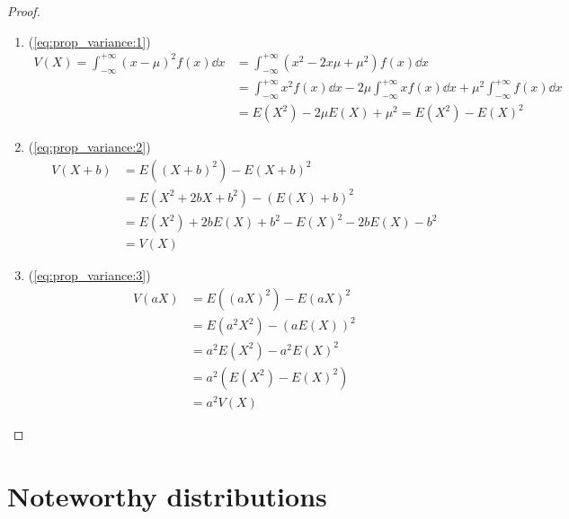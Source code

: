 \documentclass[14pt]{extarticle}
\begin{document}
\begin{proof}
    \skiplineafterproof
    \begin{enumerate}[label=\roman*.]
        \item (\autoref{eq:prop_variance:1})
              \begin{align}
                  V(X) = \int_{-\infty}^{+\infty} (x - \mu)^2 f(x) \dd{x} & = \int_{-\infty}^{+\infty} (x^2 - 2x\mu + \mu^2) f(x) \dd{x}                                                                          \\
                                                                          & = \int_{-\infty}^{+\infty} x^2 f(x) \dd{x} - 2\mu \int_{-\infty}^{+\infty} x f(x) \dd{x} + \mu^2 \int_{-\infty}^{+\infty} f(x) \dd{x} \\
                                                                          & = E(X^2) - 2\mu E(X) + \mu^2 = E(X^2) - E(X)^2
              \end{align}

        \item (\autoref{eq:prop_variance:2})
              \begin{align}
                  V(X + b) & = E((X + b)^2) - E(X + b)^2                     \\
                           & = E(X^2 + 2bX + b^2) - (E(X) + b)^2             \\
                           & = E(X^2) + 2bE(X) + b^2 - E(X)^2 - 2bE(X) - b^2 \\
                           & = V(X)
              \end{align}

        \item (\autoref{eq:prop_variance:3})
              \begin{align}
                  V(aX) & = E((aX)^2) - E(aX)^2     \\
                        & = E(a^2 X^2) - (aE(X))^2  \\
                        & = a^2 E(X^2) - a^2 E(X)^2 \\
                        & = a^2 (E(X^2) - E(X)^2)   \\
                        & = a^2 V(X)
              \end{align}
    \end{enumerate}
\end{proof}


\section{Noteworthy distributions}
\end{document}
